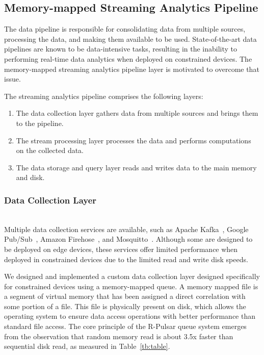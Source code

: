 
\subsection{Memory-mapped Streaming Analytics Pipeline}
The data pipeline is responsible for consolidating data from multiple sources, processing the data, and making them available to be used. State-of-the-art data pipelines are known to be data-intensive tasks, resulting in the inability to performing real-time data analytics when deployed on constrained devices. The memory-mapped streaming analytics pipeline layer is motivated to overcome that issue.

The streaming analytics pipeline comprises the following layers: 

\begin{enumerate}

\item The data collection layer gathers data from multiple sources and brings them to the pipeline.
\item The stream processing layer processes the data and performs computations on the collected data.   
\item The data storage and query layer reads and writes data to the main memory and disk.

\end{enumerate}

\vspace{1ex}
\subsubsection{Data Collection Layer}
\hfill\\
Multiple data collection services are available, such as Apache Kafka~\cite{kafka}, Google Pub/Sub~\cite{google}, Amazon Firehose~\cite{amazon}, and Mosquitto~\cite{mosquitto}. Although some are designed to be deployed on edge devices, these services offer limited performance when deployed in constrained devices due to the limited read and write disk speeds.%

We designed and implemented a custom data collection layer designed specifically for constrained devices using a memory-mapped queue. A memory mapped file is a segment of virtual memory that has been assigned a direct correlation with some portion of a file. This file is physically present on disk, which allows the operating system to ensure data access operations with better performance than standard file access. The core principle of the R-Pulsar queue system emerges from the observation that random memory read is about 3.5x faster than sequential disk read, as measured in Table~\ref{tb:table}. 


